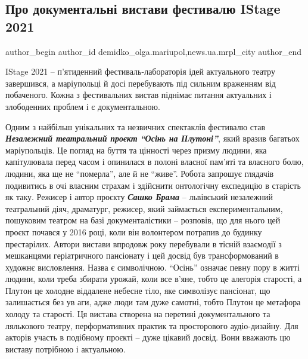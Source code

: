 
 
 
 
 
 
\subsection{Про документальні вистави фестивалю IStage 2021}
\label{sec:17_08_2021.stz.news.ua.mrpl_city.1.dokumentalni_vystavy_istage_2021}
 
\ifcmt
 author_begin
   author_id demidko_olga.mariupol,news.ua.mrpl_city
 author_end
\fi

IStage 2021 – п'ятиденний фестиваль-лабораторія ідей актуального театру
завершився, а маріупольці й досі перебувають під сильним враженням від
побаченого. Кожна з фестивальних вистав піднімає питання актуальних і
злободенних проблем і є документальною.


Одним з найбільш унікальних та незвичних спектаклів фестивалю став \emph{\textbf{Незалежний
театральний проєкт}} \emph{\textbf{\enquote{Осінь на Плутоні}}}, який вразив багатьох маріупольців.  Це
погляд на буття та цінності через призму людини, яка капітулювала перед часом і
опинилася в полоні власної пам'яті та власного болю, людини, яка ще не
\enquote{померла}, але й не \enquote{живе}. Робота запрошує глядачів подивитись в очі власним
страхам і здійснити онтологічну експедицію в старість як таку. Режисер і автор
проєкту \emph{\textbf{Сашко Брама}} – львівський незалежний театральний діяч, драматург,
режисер, який займається експериментальним, пошуковим театром на базі
документалістики – розповів, що для нього цей проєкт почався у 2016 році, коли
він волонтером потрапив до будинку престарілих. Автори вистави впродовж року
перебували в тісній взаємодії з мешканцями геріатричного пансіонату і цей
досвід був трансформований в художнє висловлення. Назва є символічною. \enquote{Осінь}
означає певну пору в житті людини, коли треба збирати урожай, коли все в'яне,
тобто це алегорія старості, а Плутон це холодне віддалене небесне тіло, яке
символізує пансіонат, що  залишається без ув аги, адже люди там дуже самотні,
тобто Плутон це метафора холоду та старості. Ця вистава створена на перетині
документального та лялькового театру, перформативних практик та просторового
аудіо-дизайну. Для акторів участь в подібному проєкті – дуже цікавий досвід.
Вони вважають цю виставу потрібною і актуальною.

